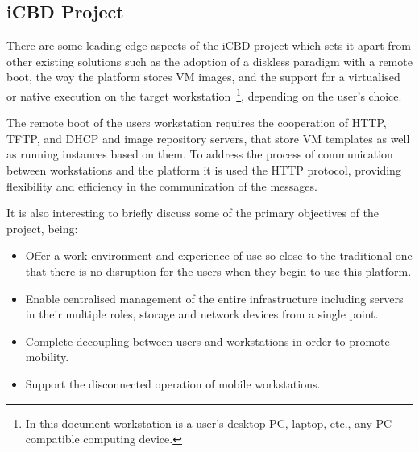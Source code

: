 


\subsection{iCBD Project} %
\label{sub:icbd_project}

There are some leading-edge aspects of the \acrfull{iCBD} project which sets it apart from other existing solutions such as the adoption of a diskless paradigm with a remote boot, the way the platform stores \gls{VM} images, and the support for a virtualised or native execution on the target workstation~\footnote{In this document workstation is a user's desktop PC, laptop, etc., any PC compatible computing device.}, depending on the user's choice.~\cite{P2020}

The remote boot of the users workstation requires the cooperation of \acrshort{HTTP}, \acrshort{TFTP}, and \acrshort{DHCP} and image repository servers, that store VM templates as well as running instances based on them.
To address the process of communication between workstations and the platform it is used the HTTP protocol, providing flexibility and efficiency in the communication of the messages.~\cite{P2020,Nuno2016,Eduardo2016}



It is also interesting to briefly discuss some of the primary objectives of the project, being:
\begin{itemize}
    \item Offer a work environment and experience of use so close to the traditional one that there is no disruption for the users when they begin to use this platform.
    \item Enable centralised management of the entire infrastructure including servers in their multiple roles, storage and network devices from a single point.
    \item Complete decoupling between users and workstations in order to promote mobility.
    \item Support the disconnected operation of mobile workstations.
\end{itemize}

